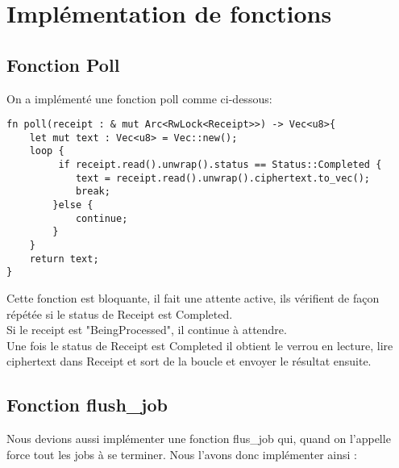 \documentclass{article}
\begin{document}
\section{Implémentation de fonctions}
\subsection{Fonction Poll}
On a implémenté une fonction poll comme ci-dessous:
\begin{lstlisting}
fn poll(receipt : & mut Arc<RwLock<Receipt>>) -> Vec<u8>{
    let mut text : Vec<u8> = Vec::new();
    loop {
         if receipt.read().unwrap().status == Status::Completed {
            text = receipt.read().unwrap().ciphertext.to_vec();
            break;
        }else {
            continue;
        }
    }
    return text;
}\end{lstlisting}
Cette fonction est bloquante, il fait une attente active, ils vérifient de façon répétée si le status de Receipt est Completed.\\
Si le receipt est "BeingProcessed", il continue à attendre.\\
Une fois le status de Receipt est Completed il obtient le verrou en lecture, lire ciphertext dans Receipt et sort de la boucle et envoyer le résultat ensuite.



\subsection{Fonction flush\_job}
Nous devions aussi implémenter une fonction flus\_job qui, quand on l'appelle force tout les jobs à se terminer. Nous l'avons donc implémenter ainsi :
\end{document}
